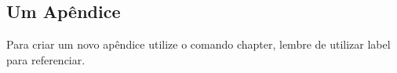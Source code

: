 \begin{apendicesenv}
  \partapendices  %

  \chapter{Um Apêndice}
  \label{ape:apendiceI}
  Para criar um novo apêndice utilize o comando chapter, lembre de utilizar label para referenciar.

\end{apendicesenv}
